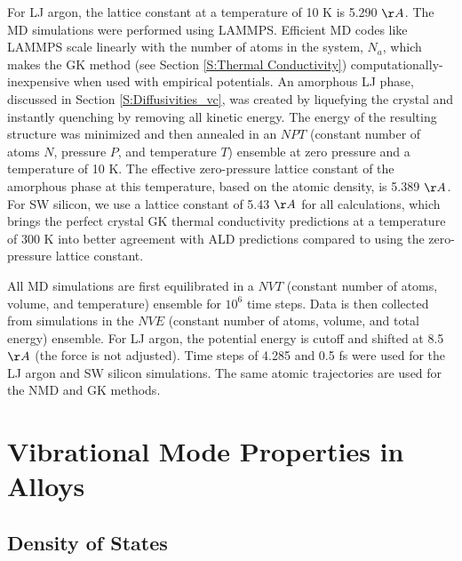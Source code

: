 For LJ argon, the lattice constant 
at a temperature of 10 K is 5.290 $\AA$.\cite{mcgaughey_phonon_2004} 
The MD simulations were performed using LAMMPS.\cite{plimpton_fast_1995} 
Efficient MD 
codes like LAMMPS scale linearly with the number of atoms in 
the system, $N_a$, which makes the GK method (see Section 
\ref{S:Thermal Conductivity}) 
computationally-inexpensive when used with empirical potentials. 
An amorphous LJ phase, discussed in Section \ref{S:Diffusivities_vc}, 
was created by liquefying the crystal 
and instantly quenching by removing all kinetic energy.  The energy 
of the resulting structure was minimized and then annealed in an 
$NPT$ (constant number of atoms $N$, pressure $P$, and temperature $T$) 
ensemble at zero pressure and a temperature of 10 K.  
The effective zero-pressure lattice constant  
of the amorphous phase at this temperature, based on the atomic 
density, is 5.389 $\AA$.  
For SW silicon, we use a lattice constant of 5.43 $\AA$ 
for all calculations, which brings the perfect crystal GK 
thermal conductivity predictions at a temperature of 300 K
\cite{goicochea_thermal_2010,he_lattice_2012} 
into better agreement with ALD predictions\cite{sellan_cross-plane_2010} 
compared to using the zero-pressure lattice constant. 

All MD simulations are first equilibrated in a $NVT$ (constant 
number of atoms, volume, and temperature) ensemble for 
$10^6$ time steps. Data is then collected from simulations in the $NVE$ 
(constant number of 
atoms, volume, and total energy) ensemble. For LJ argon, the potential 
energy is cutoff and shifted at 8.5 $\AA$ (the force is not adjusted). 
Time steps of 4.285 and 0.5 fs were used for the LJ argon and 
SW silicon simulations. The same atomic trajectories are used for the 
NMD and GK methods. 

\section{\label{S:Vibrational}
Vibrational Mode Properties in Alloys}

\subsection{\label{S:VC Gamma DOS}Density of States}

